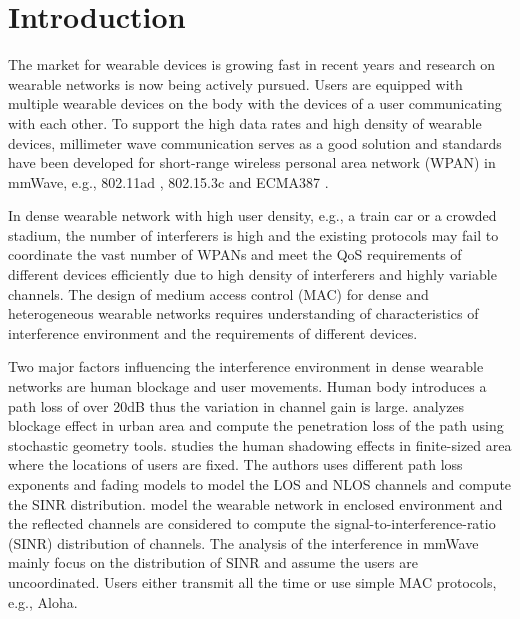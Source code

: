 \documentclass[10pt, conference, letterpaper]{IEEEtran}
\begin{document}
\section{Introduction}\label{section:introduction}

The market for wearable devices is growing fast in recent years \cite{wearable} and research on wearable networks is now being actively pursued.  Users are equipped with multiple wearable devices on the body with the devices of a user communicating with each other. To support the high data rates and high density of wearable devices, millimeter wave communication serves as a good solution and standards have been developed for short-range wireless personal area network (WPAN) in mmWave, e.g., 802.11ad \cite{80211ad}, 802.15.3c \cite{802153c} and ECMA387 \cite{ECMA387}. 

In dense wearable network with high user density, e.g., a train car or a crowded stadium, the number of interferers is high and the existing protocols may fail to coordinate the vast number of WPANs and meet the QoS requirements of different devices efficiently due to high density of interferers and highly variable channels. The design of medium access control (MAC) for dense and heterogeneous wearable networks requires understanding of characteristics of interference environment and the requirements of different devices.

Two major factors influencing the interference environment in dense wearable networks are human blockage and user movements. Human body introduces a path loss of over 20dB \cite{humanshadowing} thus the variation in channel gain is large. \cite{urbanblockage} analyzes blockage effect in urban area and compute the penetration loss of the path using stochastic geometry tools. \cite{interferencefinitesized} studies the human shadowing effects in finite-sized area where the locations of users are fixed. The authors uses different path loss exponents and fading models to model the LOS and NLOS channels and compute the SINR distribution. \cite{enclosedmmwave} model the wearable network in enclosed environment and the reflected channels are considered to compute the signal-to-interference-ratio (SINR) distribution of channels. The analysis of the interference in mmWave mainly focus on the distribution of SINR and assume the users are uncoordinated. Users either transmit all the time or use simple MAC protocols, e.g., Aloha. 
\end{document}
